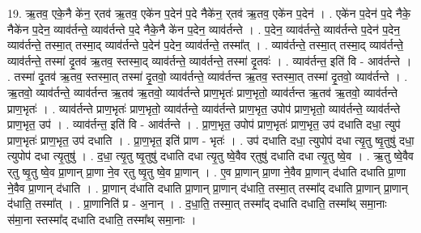 \documentclass[17pt]{extarticle}
\begin{document}
19. ऋ॒तव॒ एके॒नै के॑न॒ र्‌तव॑ ऋ॒तव॒ एके॑न प॒देन॑ प॒दे नैके॑न॒ र्‌तव॑ ऋ॒तव॒ एके॑न प॒देन॑ । . एके॑न प॒देन॑ प॒दे नैके॒ नैके॑न प॒देन॒ व्याव॑र्तन्ते॒ व्याव॑र्तन्ते प॒दे नैके॒नै के॑न प॒देन॒ व्याव॑र्तन्ते । . प॒देन॒ व्याव॑र्तन्ते॒ व्याव॑र्तन्ते प॒देन॑ प॒देन॒ व्याव॑र्तन्ते॒ तस्मा॒त् तस्मा॒द् व्याव॑र्तन्ते प॒देन॑ प॒देन॒ व्याव॑र्तन्ते॒ तस्मा᳚त् । . व्याव॑र्तन्ते॒ तस्मा॒त् तस्मा॒द् व्याव॑र्तन्ते॒ व्याव॑र्तन्ते॒ तस्मा॑ दृ॒तव॑ ऋ॒तव॒ स्तस्मा॒द् व्याव॑र्तन्ते॒ व्याव॑र्तन्ते॒ तस्मा॑ दृ॒तवः॑ । . व्याव॑र्तन्त॒ इति॑ वि - आव॑र्तन्ते । . तस्मा॑ दृ॒तव॑ ऋ॒तव॒ स्तस्मा॒त् तस्मा॑ दृ॒तवो॒ व्याव॑र्तन्ते॒ व्याव॑र्तन्त ऋ॒तव॒ स्तस्मा॒त् तस्मा॑ दृ॒तवो॒ व्याव॑र्तन्ते । . ऋ॒तवो॒ व्याव॑र्तन्ते॒ व्याव॑र्तन्त ऋ॒तव॑ ऋ॒तवो॒ व्याव॑र्तन्ते प्राण॒भृतः॑ प्राण॒भृतो॒ व्याव॑र्तन्त ऋ॒तव॑ ऋ॒तवो॒ व्याव॑र्तन्ते प्राण॒भृतः॑ । . व्याव॑र्तन्ते प्राण॒भृतः॑ प्राण॒भृतो॒ व्याव॑र्तन्ते॒ व्याव॑र्तन्ते प्राण॒भृत॒ उपोप॑ प्राण॒भृतो॒ व्याव॑र्तन्ते॒ व्याव॑र्तन्ते प्राण॒भृत॒ उप॑ । . व्याव॑र्तन्त॒ इति॑ वि - आव॑र्तन्ते । . प्रा॒ण॒भृत॒ उपोप॑ प्राण॒भृतः॑ प्राण॒भृत॒ उप॑ दधाति दधा॒ त्युप॑ प्राण॒भृतः॑ प्राण॒भृत॒ उप॑ दधाति । . प्रा॒ण॒भृत॒ इति॑ प्राण - भृतः॑ । . उप॑ दधाति दधा॒ त्युपोप॑ दधा त्यृ॒तु ष्वृ॒तुषु॑ दधा॒ त्युपोप॑ दधा त्यृ॒तुषु॑ । . द॒धा॒ त्यृ॒तु ष्वृ॒तुषु॑ दधाति दधा त्यृ॒तु ष्वे॒वैव र्‌तुषु॑ दधाति दधा त्यृ॒तु ष्वे॒व । . ऋ॒तु ष्वे॒वैव र्‌तु ष्वृ॒तु ष्वे॒व प्रा॒णान् प्रा॒णा ने॒व र्‌तु ष्वृ॒तु ष्वे॒व प्रा॒णान् । . ए॒व प्रा॒णान् प्रा॒णा ने॒वैव प्रा॒णान् द॑धाति दधाति प्रा॒णा ने॒वैव प्रा॒णान् द॑धाति । . प्रा॒णान् द॑धाति दधाति प्रा॒णान् प्रा॒णान् द॑धाति॒ तस्मा॒त् तस्मा᳚द् दधाति प्रा॒णान् प्रा॒णान् द॑धाति॒ तस्मा᳚त् । . प्रा॒णानिति॑ प्र - अ॒नान् । . द॒धा॒ति॒ तस्मा॒त् तस्मा᳚द् दधाति दधाति॒ तस्मा᳚थ् समा॒नाः स॑मा॒ना स्तस्मा᳚द् दधाति दधाति॒ तस्मा᳚थ् समा॒नाः । \newline
\end{document}
